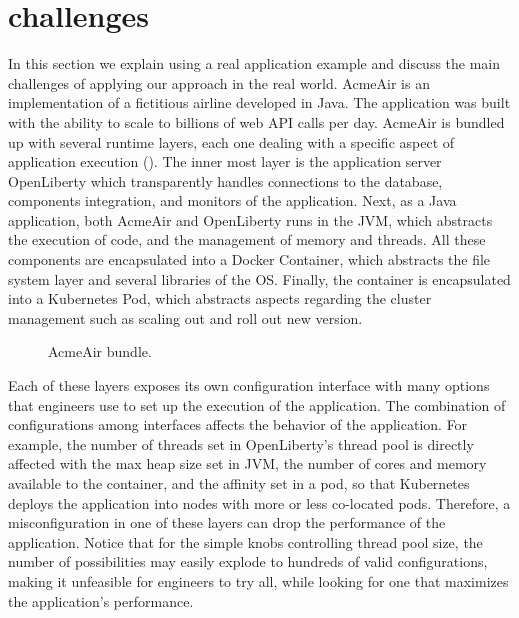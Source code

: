 \section{\name challenges}



In this section we explain \name using a real application example and discuss
the main challenges of applying our approach in the real world.
AcmeAir is an
implementation of a fictitious airline developed in Java. The application was
built with the ability to scale to billions of web API calls per day. AcmeAir is
bundled up with several runtime layers, each one dealing with a specific aspect
of application execution (). The inner most layer is the
application server OpenLiberty which transparently handles connections to the
database, components integration, and monitors of the application. Next, as a
Java application, both AcmeAir and OpenLiberty runs in the JVM, which abstracts
the execution of code, and the management of memory and threads. All these
components are encapsulated into a Docker Container, which abstracts the file
system layer and several libraries of the OS. Finally, the container is
encapsulated into a Kubernetes Pod, which abstracts aspects regarding the
cluster management such as scaling out and roll out new version.

\begin{figure*}[htp]
    \centering
    \def\svgwidth{\textwidth}
    \scalebox{1.0}{}
    \caption{AcmeAir bundle.}
    \label{fig:acmeair-bundle}
\end{figure*}

Each of these layers exposes its own configuration interface with many options
that engineers use to set up the execution of the application. The combination
of configurations among interfaces affects the behavior of the application. For
example, the number of threads set in OpenLiberty's thread pool is directly
affected with the max heap size set in JVM, the number of cores and memory
available to the container, and the affinity set in a pod, so that Kubernetes
deploys the application into nodes with more or less co-located pods. Therefore,
a misconfiguration in one of these layers can drop the performance of the
application. Notice that for the simple knobs controlling thread pool size, the
number of possibilities may easily explode to hundreds of valid configurations,
making it unfeasible for engineers to try all, while looking for one that
maximizes the application's performance.

